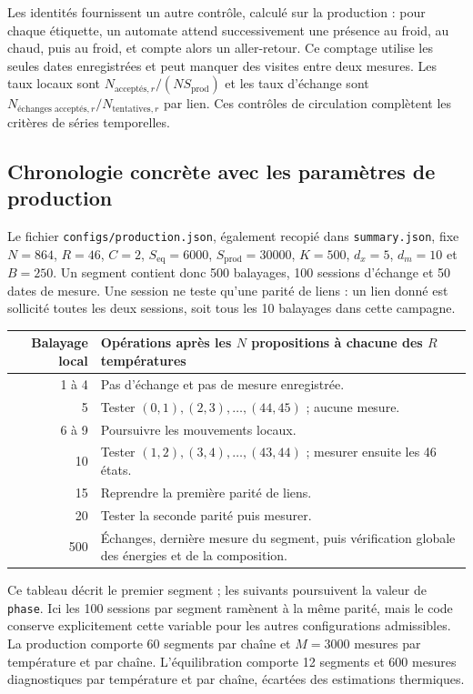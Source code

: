 \documentclass[10pt,a4paper]{article}
\begin{document}
Les identités fournissent un autre contrôle, calculé sur la production :
pour chaque étiquette, un automate attend successivement une présence au
froid, au chaud, puis au froid, et compte alors un aller-retour. Ce comptage
utilise les seules dates enregistrées et peut manquer des visites entre
deux mesures. Les taux locaux sont
$N_{\text{acceptés},r}/(NS_{\mathrm{prod}})$ et les taux d'échange sont
$N_{\text{échanges acceptés},r}/N_{\mathrm{tentatives},r}$ par lien.
Ces contrôles de circulation complètent les critères de séries temporelles.

\subsection{Chronologie concrète avec les paramètres de production}
Le fichier \texttt{configs/production.json}, également recopié dans
\texttt{summary.json}, fixe $N=864$, $R=46$, $C=2$,
$S_{\mathrm{eq}}=6000$, $S_{\mathrm{prod}}=30000$, $K=500$,
$d_x=5$, $d_m=10$ et $B=250$. Un segment contient donc 500 balayages,
100 sessions d'échange et 50 dates de mesure. Une session ne teste
qu'une parité de liens : un lien donné est sollicité toutes les deux
sessions, soit tous les 10 balayages dans cette campagne.

\begin{center}\small
\begin{tabular}{r p{.66\linewidth}}
\toprule
Balayage local & Opérations après les $N$ propositions à chacune des $R$ températures\\
\midrule
1 à 4 & Pas d'échange et pas de mesure enregistrée.\\
5 & Tester $(0,1),(2,3),\ldots,(44,45)$ ; aucune mesure.\\
6 à 9 & Poursuivre les mouvements locaux.\\
10 & Tester $(1,2),(3,4),\ldots,(43,44)$ ; mesurer ensuite les 46 états.\\
15 & Reprendre la première parité de liens.\\
20 & Tester la seconde parité puis mesurer.\\
500 & Échanges, dernière mesure du segment, puis vérification globale des énergies et de la composition.\\
\bottomrule
\end{tabular}
\end{center}

Ce tableau décrit le premier segment ; les suivants poursuivent la valeur
de \texttt{phase}. Ici les 100 sessions par segment ramènent à la même
parité, mais le code conserve explicitement cette variable pour les autres
configurations admissibles. La production comporte 60 segments par chaîne
et $M=3000$ mesures par température et par chaîne. L'équilibration comporte
12 segments et 600 mesures diagnostiques par température et par chaîne,
écartées des estimations thermiques.
\end{document}
